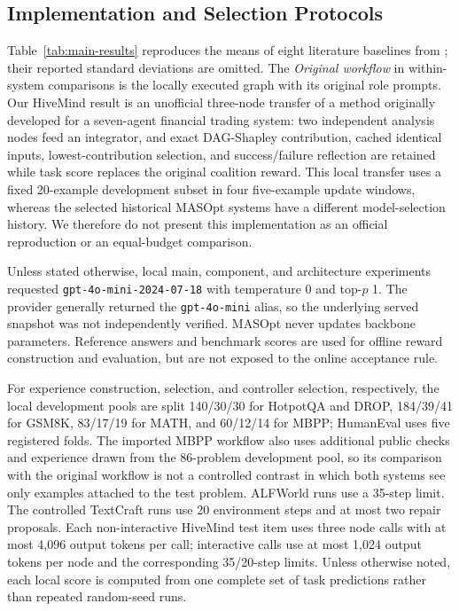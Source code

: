 \subsection{Implementation and Selection Protocols}
\label{app:protocols}

Table~\ref{tab:main-results} reproduces the means of eight literature baselines from \citet{hong2026maspob}; their reported standard deviations are omitted. The \emph{Original workflow} in within-system comparisons is the locally executed graph with its original role prompts. Our HiveMind result is an unofficial three-node transfer of a method originally developed for a seven-agent financial trading system: two independent analysis nodes feed an integrator, and exact DAG-Shapley contribution, cached identical inputs, lowest-contribution selection, and success/failure reflection are retained while task score replaces the original coalition reward. This local transfer uses a fixed 20-example development subset in four five-example update windows, whereas the selected historical MASOpt systems have a different model-selection history. We therefore do not present this implementation as an official reproduction or an equal-budget comparison.

Unless stated otherwise, local main, component, and architecture experiments requested \texttt{gpt-4o-mini-2024-07-18} with temperature 0 and top-$p$ 1. The provider generally returned the \texttt{gpt-4o-mini} alias, so the underlying served snapshot was not independently verified. MASOpt never updates backbone parameters. Reference answers and benchmark scores are used for offline reward construction and evaluation, but are not exposed to the online acceptance rule.

For experience construction, selection, and controller selection, respectively, the local development pools are split 140/30/30 for HotpotQA and DROP, 184/39/41 for GSM8K, 83/17/19 for MATH, and 60/12/14 for MBPP; HumanEval uses five registered folds. The imported MBPP workflow also uses additional public checks and experience drawn from the 86-problem development pool, so its comparison with the original workflow is not a controlled contrast in which both systems see only examples attached to the test problem. ALFWorld runs use a 35-step limit. The controlled TextCraft runs use 20 environment steps and at most two repair proposals. Each non-interactive HiveMind test item uses three node calls with at most 4,096 output tokens per call; interactive calls use at most 1,024 output tokens per node and the corresponding 35/20-step limits. Unless otherwise noted, each local score is computed from one complete set of task predictions rather than repeated random-seed runs.

